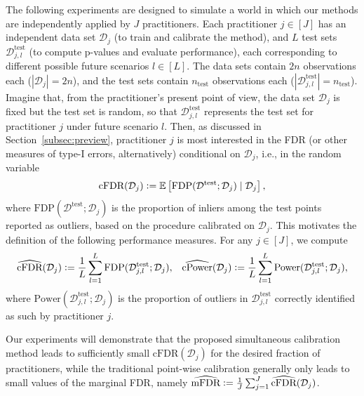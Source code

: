 \documentclass[11pt]{article}
\newcommand{\defeq}{\vcentcolon=}
\def\E{\mathbb{E}}
\begin{document}
The following experiments are designed to simulate a world in which our methods are {independently applied by $J$ practitioners}. Each practitioner $j \in [J]$ has an independent data set $\mathcal{D}_j$ (to train and calibrate the method), and $L$ test sets $\mathcal{D}^{\mathrm{test}}_{j,l}$ (to compute p-values and evaluate performance), each corresponding to different possible future scenarios $l \in [L]$.
The data sets contain $2n$ observations each ($|\mathcal{D}_j|=2n$), and the test sets contain $n_{\text{test}}$ observations each ($|\mathcal{D}^{\mathrm{test}}_{j,l}|=n_{\text{test}}$).
Imagine that, from the practitioner's present point of view, the data set $\mathcal{D}_j$ is fixed but the test set is random, so that $\mathcal{D}^{\mathrm{test}}_{j,l}$ represents the test set for practitioner $j$ under future scenario $l$. 
Then, as discussed in Section~\ref{subsec:preview}, practitioner $j$ {is most interested in the FDR} (or other measures of type-I errors, alternatively) conditional on $\mathcal{D}_j${, i.e., in the random variable}
\begin{align*}
\text{cFDR}(\mathcal{D}_j) \defeq \E\left[ \text{FDP}(\mathcal{D}^{\mathrm{test}}; \mathcal{D}_j) \mid \mathcal{D}_j \right],
\end{align*}
where $\text{FDP}(\mathcal{D}^{\mathrm{test}}; \mathcal{D}_j)$ is the proportion of inliers among the test points reported as outliers, based on the procedure calibrated on $\mathcal{D}_j$.
This motivates the definition of the following performance measures. For any $j \in [J]$, we compute
\begin{align} \label{eq:fdr-pow-sim}
    & \widehat{\text{cFDR}}(\mathcal{D}_j) \defeq \frac{1}{L} \sum_{l=1}^{L} \text{FDP}(\mathcal{D}^{\mathrm{test}}_{j,l}; \mathcal{D}_j),
    & \widehat{\text{cPower}}(\mathcal{D}_j)
    \defeq \frac{1}{L} \sum_{l=1}^{L} \text{Power}(\mathcal{D}^{\mathrm{test}}_{j,l}; \mathcal{D}_j),
\end{align}
where $\text{Power}(\mathcal{D}^{\mathrm{test}}_{j,l}; \mathcal{D}_j)$ is the proportion of outliers in $\mathcal{D}^{\mathrm{test}}_{j,l}$ correctly identified as such by practitioner $j$.

Our experiments will demonstrate that the proposed simultaneous calibration method leads to sufficiently small $\widehat{\text{cFDR}}(\mathcal{D}_j)$ for the desired fraction of practitioners, while the traditional point-wise calibration generally only leads to small values of the marginal FDR, namely $\widehat{\text{mFDR}} \defeq \frac{1}{J} \sum_{j=1}^{J} \widehat{\text{cFDR}}(\mathcal{D}_j)$.
\end{document}
